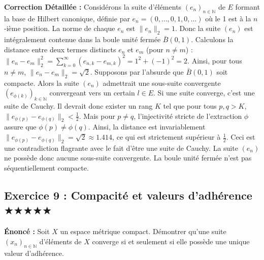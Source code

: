 \documentclass[11pt,a4paper]{article}
\begin{document}
\textbf{Correction Détaillée :}
Considérons la suite d'éléments $(e_n)_{n \in \mathbb{N}}$ de $E$ formant la base de Hilbert canonique, définie par $e_n = (0, \dots, 0, 1, 0, \dots)$ où le 1 est à la $n$-ième position.
La norme de chaque $e_n$ est $\|e_n\|_2 = 1$. Donc la suite $(e_n)$ est intégralement contenue dans la boule unité fermée $\bar{B}(0, 1)$.
Calculons la distance entre deux termes distincts $e_n$ et $e_m$ (pour $n \neq m$) :
$\|e_n - e_m\|_2^2 = \sum_{k=0}^\infty (e_{n,k} - e_{m,k})^2 = 1^2 + (-1)^2 = 2$.
Ainsi, pour tous $n \neq m$, $\|e_n - e_m\|_2 = \sqrt{2}$.
Supposons par l'absurde que $\bar{B}(0, 1)$ soit compacte. Alors la suite $(e_n)$ admettrait une sous-suite convergente $(e_{\phi(k)})_{k \in \mathbb{N}}$ convergeant vers un certain $l \in E$.
Si une suite converge, c'est une suite de Cauchy. Il devrait donc exister un rang $K$ tel que pour tous $p, q > K$, $\|e_{\phi(p)} - e_{\phi(q)}\|_2 < \frac{1}{2}$.
Mais pour $p \neq q$, l'injectivité stricte de l'extraction $\phi$ assure que $\phi(p) \neq \phi(q)$. Ainsi, la distance est invariablement $\|e_{\phi(p)} - e_{\phi(q)}\|_2 = \sqrt{2} \approx 1.414$, ce qui est strictement supérieur à $\frac{1}{2}$.
Ceci est une contradiction flagrante avec le fait d'être une suite de Cauchy. La suite $(e_n)$ ne possède donc aucune sous-suite convergente. La boule unité fermée n'est pas séquentiellement compacte.

\subsection*{Exercice 9 : Compacité et valeurs d'adhérence \quad $\bigstar\bigstar\bigstar\bigstar\bigstar$}

\textbf{Énoncé :} Soit $X$ un espace métrique compact. Démontrer qu'une suite $(x_n)_{n \in \mathbb{N}}$ d'éléments de $X$ converge si et seulement si elle possède une unique valeur d'adhérence.
\end{document}
